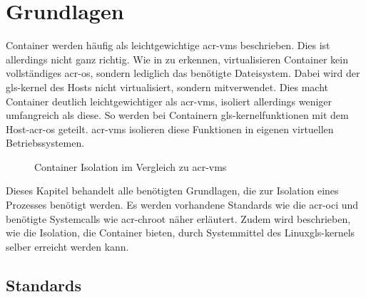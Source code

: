 \chapter{Grundlagen}
\label{chap:grundlagen}
Container werden häufig als leichtgewichtige \glspl{acr-vm} beschrieben. Dies ist allerdings nicht ganz richtig. Wie in  zu erkennen, virtualisieren Container kein vollständiges \gls{acr-os}, sondern lediglich das benötigte Dateisystem. Dabei wird der \gls{gls-kernel} des Hosts nicht virtualisiert, sondern mitverwendet. Dies macht Container deutlich leichtgewichtiger als \glspl{acr-vm}, isoliert allerdings weniger umfangreich als diese. So werden bei Containern \gls{gls-kernel}funktionen mit dem Host-\gls{acr-os} geteilt. \glspl{acr-vm} isolieren diese Funktionen in eigenen virtuellen Betriebssystemen.
\begin{figure}[h]
		\hfill
		\caption{Container Isolation im Vergleich zu \glspl{acr-vm}}
		\label{fig:containerVsVm}
\end{figure}

Dieses Kapitel behandelt alle benötigten Grundlagen, die zur Isolation eines Prozesses benötigt werden. Es werden vorhandene Standards wie die \gls{acr-oci} und benötigte Systemcalls wie \gls{acr-chroot} näher erläutert. Zudem wird beschrieben, wie die Isolation, die Container bieten, durch Systemmittel des Linux\glspl{gls-kernel} selber erreicht werden kann.
\section{Standards}
\label{sec:standards}

